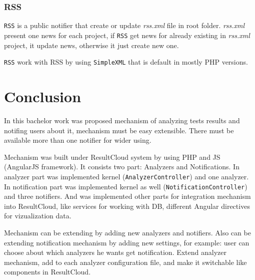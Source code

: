 \subsection{RSS}

\texttt{RSS} is a public notifier that create or update \emph{rss.xml} file in root folder. \emph{rss.xml} present one news for each project, if \texttt{RSS} get news for already existing in \emph{rss.xml} project, it update news, otherwise it just create new one.

\texttt{RSS} work with RSS by using \texttt{SimpleXML} that is default in mostly PHP versions.

\chapter{Conclusion}
\label{ch:conclusion}

In this bachelor work was proposed mechanism of analyzing tests results and notifing users about it, mechanism must be easy extensible. There must be available more than one notifier for wider using.

Mechanism was built under ResultCloud system by using PHP and JS (AngularJS framework). It consists two part: Analyzers and Notifications. In analyzer part was implemented kernel (\texttt{AnalyzerController}) and one analyzer. In notification part was implemented kernel as well (\texttt{NotificationController}) and three notifiers. And was implemented other parts for integration mechanism into ResultCloud, like services for working with DB, different Angular directives for vizualization data.

Mechanism can be extending by adding new analyzers and notifiers. Also can be extending notification mechanism by adding new settings, for example: user can choose about which analyzers he wants get notification. Extend analyzer mechanism, add to each analyzer configuration file, and make it switchable like components in ResultCloud.

